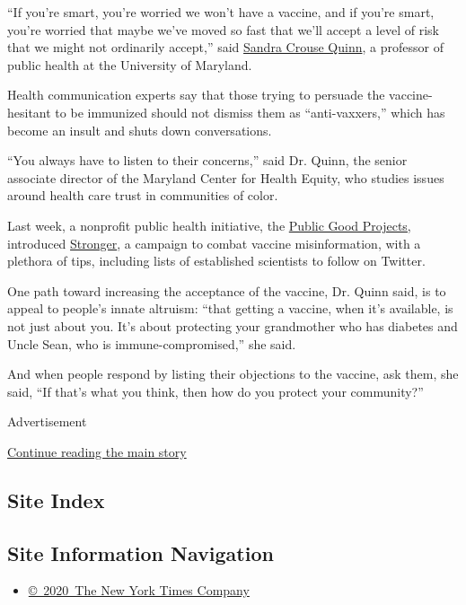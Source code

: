 ``If you're smart, you're worried we won't have a vaccine, and if you're
smart, you're worried that maybe we've moved so fast that we'll accept a
level of risk that we might not ordinarily accept,'' said
\href{https://sph.umd.edu/department/fmsc/bio/18882}{Sandra Crouse
Quinn}, a professor of public health at the University of Maryland.

Health communication experts say that those trying to persuade the
vaccine-hesitant to be immunized should not dismiss them as
``anti-vaxxers,'' which has become an insult and shuts down
conversations.

``You always have to listen to their concerns,'' said Dr. Quinn, the
senior associate director of the Maryland Center for Health Equity, who
studies issues around health care trust in communities of color.

Last week, a nonprofit public health initiative, the
\href{https://publicgoodprojects.org/}{Public Good Projects,} introduced
\href{https://stronger.org/}{Stronger}, a campaign to combat vaccine
misinformation, with a plethora of tips, including lists of established
scientists to follow on Twitter.

One path toward increasing the acceptance of the vaccine, Dr. Quinn
said, is to appeal to people's innate altruism: ``that getting a
vaccine, when it's available, is not just about you. It's about
protecting your grandmother who has diabetes and Uncle Sean, who is
immune-compromised,'' she said.

And when people respond by listing their objections to the vaccine, ask
them, she said, ``If that's what you think, then how do you protect your
community?''

Advertisement

\protect\hyperlink{after-bottom}{Continue reading the main story}

\hypertarget{site-index}{%
\subsection{Site Index}\label{site-index}}

\hypertarget{site-information-navigation}{%
\subsection{Site Information
Navigation}\label{site-information-navigation}}

\begin{itemize}
\tightlist
\item
  \href{https://help.nytimes3xbfgragh.onion/hc/en-us/articles/115014792127-Copyright-notice}{©~2020~The
  New York Times Company}
\end{itemize}

